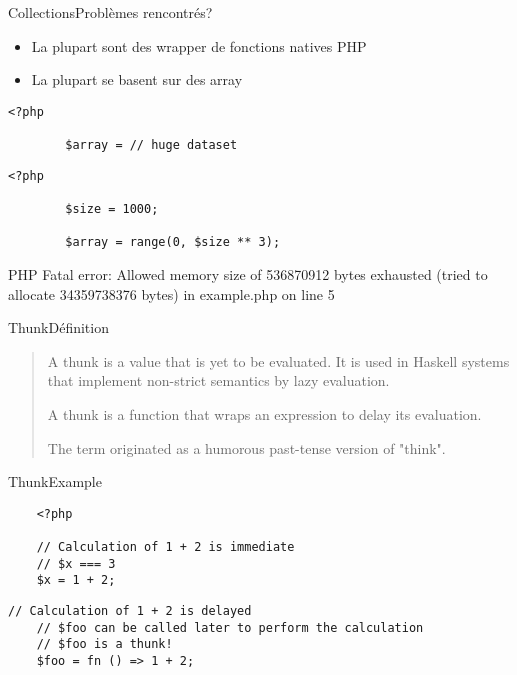 \begin{frame}{Collections}{Problèmes rencontrés?}
    \begin{itemize}[<+->]
        \item La plupart sont des wrapper de fonctions natives PHP
        \item La plupart se basent sur des array
    \end{itemize}
\end{frame}

\begin{frame}[fragile]
    \begin{lstlisting}[firstnumber=1]
        <?php

        $array = // huge dataset
    \end{lstlisting}
\end{frame}

\begin{frame}[fragile]
    \begin{lstlisting}[firstnumber=1]
        <?php

        $size = 1000;

        $array = range(0, $size ** 3);
    \end{lstlisting}
\end{frame}

\begin{frame}[fragile]
    \begin{spverbatim}
        PHP Fatal error: Allowed memory size of 536870912 bytes exhausted (tried to allocate 34359738376 bytes) in example.php on line 5
    \end{spverbatim}
\end{frame}

\begin{frame}{Thunk}{Définition}
    \begin{quote}
        A thunk is a value that is yet to be evaluated. It is used in Haskell systems that implement non-strict semantics by lazy evaluation.

        \pause

        A thunk is a function that wraps an expression to delay its evaluation.

        \pause

        The term originated as a humorous past-tense version of "think".
    \end{quote}
\end{frame}

\begin{frame}[fragile]{Thunk}{Example}
    \begin{lstlisting}
    <?php

    // Calculation of 1 + 2 is immediate
    // $x === 3
    $x = 1 + 2;
    \end{lstlisting}

    \pause

    \begin{lstlisting}[firstnumber=6]
    // Calculation of 1 + 2 is delayed
    // $foo can be called later to perform the calculation
    // $foo is a thunk!
    $foo = fn () => 1 + 2;
    \end{lstlisting}
\end{frame}

